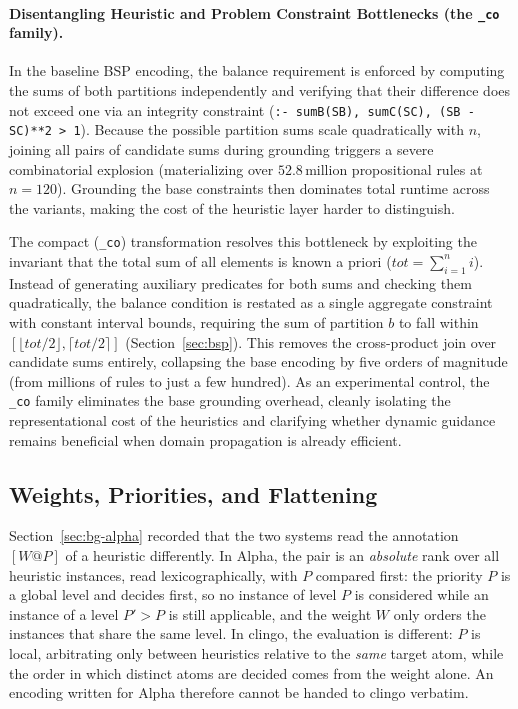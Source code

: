 \paragraph{Disentangling Heuristic and Problem Constraint Bottlenecks (the \texttt{\_co} family).}
In the baseline BSP encoding, the balance requirement is enforced by computing the sums of both partitions independently and verifying that their difference does not exceed one via an integrity constraint (\texttt{:- sumB(SB), sumC(SC), (SB - SC)**2 > 1}). Because the possible partition sums scale quadratically with $n$, joining all pairs of candidate sums during grounding triggers a severe combinatorial explosion (materializing over $52.8$\,million propositional rules at $n=120$). Grounding the base constraints then dominates total runtime across the variants, making the cost of the heuristic layer harder to distinguish.

The compact (\texttt{\_co}) transformation resolves this bottleneck by exploiting the invariant that the total sum of all elements is known a priori ($tot = \sum_{i=1}^n i$). Instead of generating auxiliary predicates for both sums and checking them quadratically, the balance condition is restated as a single aggregate constraint with constant interval bounds, requiring the sum of partition $b$ to fall within $[\lfloor tot / 2 \rfloor, \lceil tot / 2 \rceil]$ (Section~\ref{sec:bsp}). This removes the cross-product join over candidate sums entirely, collapsing the base encoding by five orders of magnitude (from millions of rules to just a few hundred). As an experimental control, the \texttt{\_co} family eliminates the base grounding overhead, cleanly isolating the representational cost of the heuristics and clarifying whether dynamic guidance remains beneficial when domain propagation is already efficient.

\subsection{Weights, Priorities, and Flattening}
\label{sec:flattening}

Section~\ref{sec:bg-alpha} recorded that the two systems read the annotation $[W@P]$ of a heuristic differently. In Alpha, the pair is an \emph{absolute} rank over all heuristic instances, read lexicographically, with $P$ compared first: the priority $P$ is a global level and decides first, so no instance of level $P$ is considered while an instance of a level $P' > P$ is still applicable, and the weight $W$ only orders the instances that share the same level. In clingo, the evaluation is different: $P$ is local, arbitrating only between heuristics relative to the \emph{same} target atom, while the order in which distinct atoms are decided comes from the weight alone. An encoding written for Alpha therefore cannot be handed to clingo verbatim.

